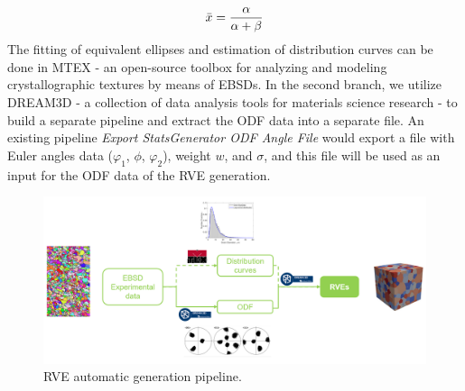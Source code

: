 \begin{equation}
\Bar{x} = \frac{\alpha}{\alpha + \beta} 
\end{equation}
The fitting of equivalent ellipses and estimation of distribution curves can be done in MTEX - an open-source toolbox for analyzing and modeling crystallographic textures by means of EBSDs. In the second branch, we utilize DREAM3D - a collection of data analysis tools for materials science research - to build a separate pipeline and extract the ODF data into a separate file. An existing pipeline \textit{Export StatsGenerator ODF Angle File} would export a file with Euler angles data ($\varphi_1$, $\phi$, $\varphi_2$), weight $w$, and $\sigma$, and this file will be used as an input for the ODF data of the RVE generation.
\begin{figure}[h!]
    \captionsetup{justification=centering,margin=1cm}
    \centering
    \includegraphics[width=1.0\textwidth]{Image/rve pipeline.png}
    \caption{RVE automatic generation pipeline.}
    \label{fig:generate}
\end{figure}

